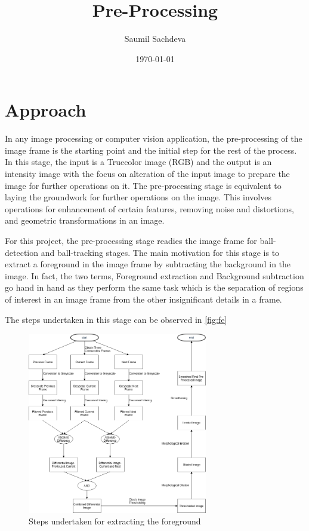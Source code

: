 \documentclass[a4paper]{article}
\title{\Large{Pre-Processing}}
\author{Saumil Sachdeva}
\date{\today}
\begin{document}
\maketitle

\section{Approach}
In any image processing or computer vision application, the pre-processing of the image frame is the starting point and the initial step for the rest of the process. In this stage, the input is a Truecolor image (RGB) and the output is an intensity image with the focus on alteration of the input image to prepare the image for further operations on it. The pre-processing stage is equivalent to laying the groundwork for further operations on the image. This involves operations for enhancement of certain features, removing noise and distortions, and geometric transformations in an image.\cite{Sonka1993}
\par 
For this project, the pre-processing stage readies the image frame for ball-detection and ball-tracking stages. The main motivation for this stage is to extract a foreground in the image frame by subtracting the background in the image. In fact, the two terms, Foreground extraction and Background subtraction go hand in hand as they perform the same task which is the separation of regions of interest in an image frame from the other insignificant details in a frame. \par
The steps undertaken in this stage can be observed in \autoref{fig:fe}
\begin{figure}[H]
\centering
\includegraphics[width=0.7\textwidth]{Foreground_Extraction.png}
\caption{\label{fig:fe}Steps undertaken for extracting the foreground}
\end{figure}
\end{document}

